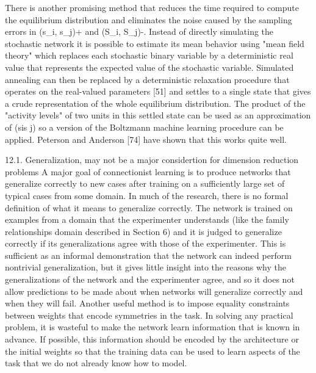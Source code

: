 \documentclass{article}
\begin{document}
There is another promising method that reduces the time required to compute the equilibrium distribution and eliminates the noise caused by the sampling errors in (s_i, s_j)+ and (S_i, S_j)-. Instead of directly simulating the stochastic network it is possible to estimate its mean behavior using "mean field theory" which replaces each stochastic binary variable by a deterministic real value that represents the expected value of the stochastic variable. Simulated annealing can then be replaced by a deterministic relaxation procedure that operates on the real-valued parameters [51] and settles to a single state that gives a crude representation of the whole equilibrium distribution. The product of the "activity levels" of two units in this settled state can be used as an approximation of (sis j) so a version of the Boltzmann machine learning procedure can be applied. Peterson and Anderson [74] have shown that this works quite well.

12.1. Generalization, may not be a major considertion for dimension reduction problems
A major goal of connectionist learning is to produce networks that generalize correctly to new cases after training on a sufficiently large set of typical cases from some domain. In much of the research, there is no formal definition of what it means to generalize correctly. The network is trained on examples from a domain that the experimenter understands (like the family relationships domain described in Section 6) and it is judged to generalize correctly if its generalizations agree with those of the experimenter. This is sufficient as an informal demonstration that the network can indeed perform nontrivial generalization, but it gives little insight into the reasons why the generalizations of the network and the experimenter agree, and so it does not allow predictions to be made about when networks will generalize correctly and when they will fail.
    Another useful method is to impose equality constraints between weights that encode symmetries in the task. In solving any practical problem, it is wasteful to make the network learn information that is known in advance. If possible, this information should be encoded by the architecture or the initial weights so that the training data can be used to learn aspects of the task that we do not already know how to model.
\end{document}
